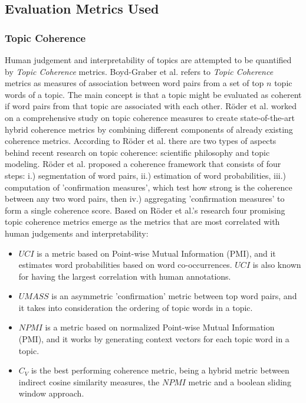     
    \subsection{Evaluation Metrics Used \label{background:metrics}}
        
        \subsubsection{Topic Coherence\label{background:T_coherence}}
            Human judgement and interpretability of topics are attempted to be quantified by \emph{Topic Coherence} metrics. Boyd-Graber et al. \cite{boyd2014care} refers to \emph{Topic Coherence} metrics as measures of association between word pairs from a set of top $n$ topic words of a topic. The main concept is that a topic might be evaluated as coherent if word pairs from that topic are associated with each other. R{\"o}der et al. \cite{roder2015exploring} worked on a comprehensive study on topic coherence measures to create state-of-the-art hybrid coherence metrics by combining different components of already existing coherence metrics. According to R{\"o}der et al. there are two types of aspects behind recent research on topic coherence: scientific philosophy and topic modeling. R{\"o}der et al. proposed a coherence framework that consists of four steps: i.) segmentation of word pairs, ii.) estimation of word probabilities, iii.) computation of 'confirmation measures', which test how strong is the coherence between any two word pairs, then iv.) aggregating 'confirmation measures' to form a single coherence score. Based on R{\"o}der et al.'s research four promising topic coherence metrics emerge as the metrics that are most correlated with human judgements and interpretability:
                \begin{itemize}
                    \item $UCI$ is a metric based on Point-wise Mutual Information (PMI), and it estimates word probabilities based on word co-occurrences. $UCI$ is also known for having the largest correlation with human annotations.
                    \item $UMASS$ is an asymmetric 'confirmation' metric between top word pairs, and it takes into consideration the ordering of topic words in a topic.
                    \item $NPMI$ is a metric based on normalized Point-wise Mutual Information (PMI), and it works by generating context vectors for each topic word in a topic.
                    \item $C_V$ is the best performing coherence metric, being a hybrid metric between indirect cosine similarity measures, the $NPMI$ metric and a boolean sliding window approach.
                \end{itemize}
                
